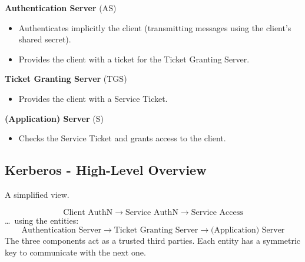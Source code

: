 \begin{multicols}{3}
    \raggedcolumns

\textbf{Authentication Server}
\hspace*{2.5cm}(AS)
\begin{itemize}
    \item Authenticates implicitly the client (transmitting messages using the client's shared secret).
    \item Provides the client with a ticket for the Ticket Granting Server.
\end{itemize}
\columnbreak

\textbf{Ticket Granting Server}
\hspace*{2.5cm}(TGS)
\begin{itemize}
    \item Provides the client with a Service Ticket.
\end{itemize}
\columnbreak

\textbf{(Application) Server}
\hspace*{2.5cm}(S)
\begin{itemize}
    \item Checks the Service Ticket and grants access to the client.
\end{itemize}
\end{multicols}


\subsection{Kerberos - High-Level Overview}
\begin{center}
    A simplified view.
\end{center}
\[
    \boxed{\text{Client AuthN}} \rightarrow \boxed{\text{Service AuthN}} \rightarrow \boxed{\text{Service Access}}
\]
\dots \ using the entities:
\[
    \text{Authentication Server} \rightarrow \text{Ticket Granting Server} \rightarrow \text{(Application) Server}
\]
The three components act as a trusted third parties. Each entity has a symmetric key to communicate with the next one.

